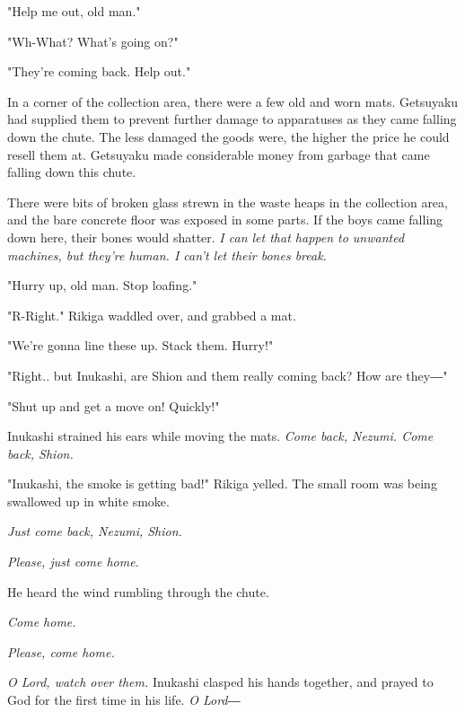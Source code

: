 "Help me out, old man."

"Wh-What? What's going on?"

"They're coming back. Help out."

In a corner of the collection area, there were a few old and worn mats.
Getsuyaku had supplied them to prevent further damage to apparatuses as
they came falling down the chute. The less damaged the goods were, the
higher the price he could resell them at. Getsuyaku made considerable
money from garbage that came falling down this chute.

There were bits of broken glass strewn in the waste heaps in the
collection area, and the bare concrete floor was exposed in some parts.
If the boys came falling down here, their bones would shatter. \emph{I can let
that happen to unwanted machines, but they're human. I can't let their
bones break.}

"Hurry up, old man. Stop loafing."

"R-Right." Rikiga waddled over, and grabbed a mat.

"We're gonna line these up. Stack them. Hurry!"

"Right.. but Inukashi, are Shion and them really coming back? How are
they―"

"Shut up and get a move on! Quickly!"

Inukashi strained his ears while moving the mats. \emph{Come back, Nezumi.
Come back, Shion.}

"Inukashi, the smoke is getting bad!" Rikiga yelled. The small room was
being swallowed up in white smoke.

\emph{Just come back, Nezumi, Shion.}

\emph{Please, just come home.}

He heard the wind rumbling through the chute.

\emph{Come home.}

\emph{Please, come home.}

\emph{O Lord, watch over them.} Inukashi clasped his hands together, and prayed
to God for the first time in his life. \emph{O Lord―}